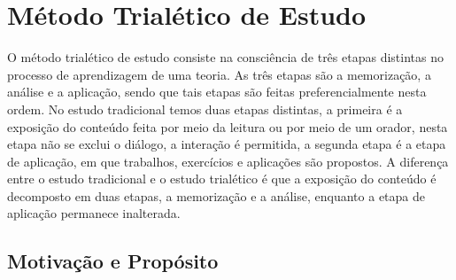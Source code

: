 

\chapter{Método Trialético de Estudo}

\hspace{\baselineskip}

O método trialético de estudo consiste na consciência de três etapas distintas no processo de aprendizagem de uma teoria. As três etapas são a memorização, a análise e a aplicação, sendo que tais etapas são feitas preferencialmente nesta ordem. No estudo tradicional temos duas etapas distintas, a primeira é a exposição do conteúdo feita por meio da leitura ou por meio de um orador, nesta etapa não se exclui o diálogo, a interação é permitida, a segunda etapa é a etapa de aplicação, em que trabalhos, exercícios e aplicações são propostos. A diferença entre o estudo tradicional e o estudo trialético é que a exposição do conteúdo é decomposto em duas etapas, a memorização e a análise, enquanto a etapa de aplicação permanece inalterada.


\section{Motivação e Propósito}

\hspace{\baselineskip}


